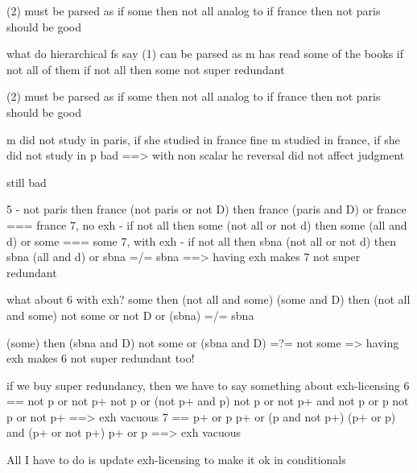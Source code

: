 	(2) must be parsed as 
	if some then not all
	analog to if france then not paris should be good
	
	
	what do hierarchical fs say
	(1) can be parsed as
	m has read some of the books if not all of them
	if not all then some not super redundant
	
	(2) must be parsed as 
	if some then not all
	analog to if france then not paris should be good
	
	
	
	m did not study in paris, if she studied in france fine
	m studied in france, if she did not study in p bad
	==> with non scalar hc reversal did not affect judgment
	
	
	\begin{exe}
		 still bad
	\end{exe}
	5 - not paris then france
	(not paris or not D) then france
	(paris and D) or france === france
	7, no exh - if not all then some
	(not all or not d) then some
	(all and d) or some === some 
	7, with exh - if not all then sbna
	(not all or not d) then sbna
	(all and d) or sbna =/= sbna
	==> having exh makes 7 not super redundant
	
	what about 6 with exh?
	some then (not all and some)
	(some and D) then (not all and some)
	not some or not D or (sbna)  =/= sbna 
	
	(some) then (sbna and D)
	not some or (sbna and D) =?= not some
	=> having exh makes 6 not super redundant too!
	
	if we buy super redundancy, then we have to say something about exh-licensing
	6 == not p or not p+
	not p or (not p+ and p)
	not p or not p+ and not p or p
	not p or not p+
	==> exh vacuous
	7 == p+ or p
	p+ or (p and not p+)
	(p+ or p) and (p+ or not p+)
	p+ or p
	==> exh vacuous
	
	All I have to do is update exh-licensing to make it ok in conditionals
	

